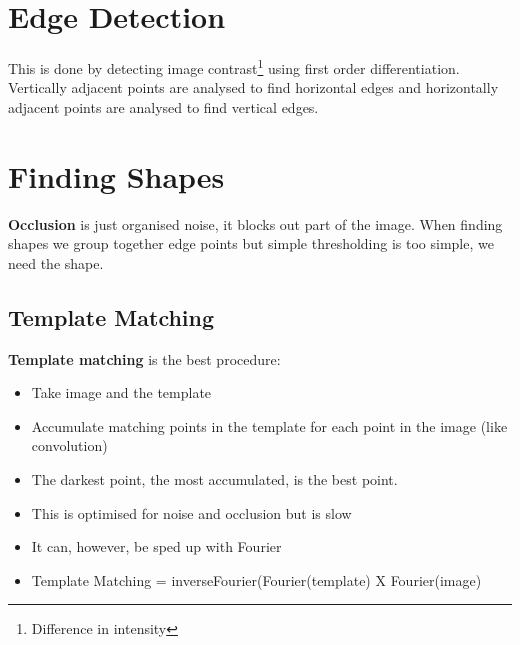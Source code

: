 \documentclass{article}
\begin{document}
	\section{Edge Detection}
	This is done by detecting image contrast\footnote{Difference in intensity} using first order differentiation. Vertically adjacent points are analysed to find horizontal edges and horizontally adjacent points are analysed to find vertical edges. 
	\section{Finding Shapes}
	\textbf{Occlusion} is just organised noise, it blocks out part of the image. When finding shapes we group together edge points but simple thresholding is too simple, we need the shape.
	\subsection{Template Matching}
	\textbf{Template matching} is the best procedure:
	\begin{itemize}
		\item Take image and the template
		\item Accumulate matching points in the template for each point in the image (like convolution)
		\item The darkest point, the most accumulated, is the best point.
		\item This is optimised for noise and occlusion but is slow
		\item It can, however, be sped up with Fourier
		\item Template Matching = inverseFourier(Fourier(template) X Fourier(image)
	\end{itemize}
\end{document}
